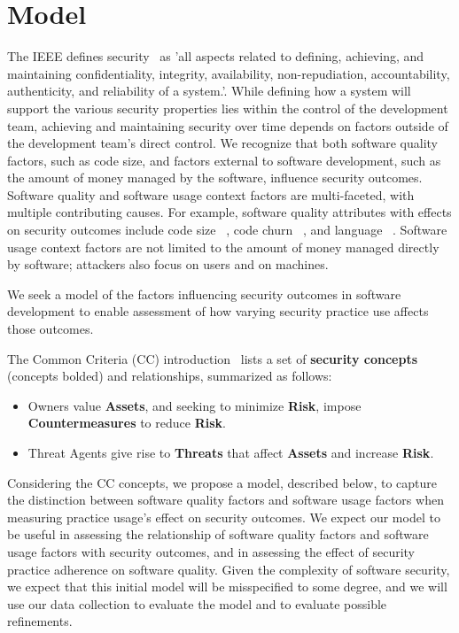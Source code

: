 \section{Model}
\label{sec:model}


The IEEE defines security~\cite{ieee1990glossary} as 'all aspects related to defining, achieving, and maintaining confidentiality, integrity, availability, non-repudiation, accountability, authenticity, and reliability of a system.'. While defining how a system will support the various security properties lies within the control of the development team, achieving and maintaining security over time depends on factors outside of the development team's direct control. We recognize that both software quality factors, such as code size, and factors external to software development, such as the amount of money managed by the software, influence security outcomes. Software quality and software usage context factors are multi-faceted, with multiple contributing causes. For example, software quality attributes with effects on security outcomes include code size ~\cite{alhazmi2007measuring}, code churn ~\cite{shin2011evaluating}, and language ~\cite{ray2014a}. Software usage context factors are not limited to the amount of money managed directly by software; attackers also focus on users and on machines. 
 
We seek a model of the factors influencing security outcomes in software development to enable assessment of how varying security practice use affects those outcomes. 
 
 The Common Criteria (CC) introduction~\cite{common2012common} lists a set of \textbf{security concepts} (concepts bolded) and relationships, summarized as follows:
 \begin{itemize}
 	\item  Owners value \textbf{Assets}, and seeking to minimize \textbf{Risk}, impose \textbf{Countermeasures} to reduce \textbf{Risk}.
 	\item Threat Agents give rise to \textbf{Threats} that affect \textbf{Assets} and increase \textbf{Risk}.
 \end{itemize}
 
 Considering the CC concepts, we propose a model, described below, to capture the distinction between software quality factors and software usage factors when measuring practice usage's effect on security outcomes. We expect our model to be useful in assessing the relationship of software quality factors and software usage factors with security outcomes, and in assessing the effect of security practice adherence on software quality. Given the complexity of software security, we expect that this initial model will be misspecified to some degree, and we will use our data collection to evaluate the model and to evaluate possible refinements.

